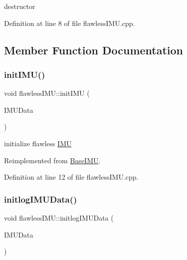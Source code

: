destructor 



Definition at line 8 of file flawless\+I\+M\+U.\+cpp.



\subsection{Member Function Documentation}
\mbox{\label{classflawless_i_m_u_a7dd4d315fa319eef68987b17fb636c43}} 
\subsubsection{\texorpdfstring{init\+I\+M\+U()}{initIMU()}}
{\footnotesize\ttfamily void flawless\+I\+M\+U\+::init\+I\+MU (\begin{DoxyParamCaption}\item[{I\+M\+U\+Struct \&}]{I\+M\+U\+Data }\end{DoxyParamCaption})\hspace{0.3cm}{\ttfamily [virtual]}}



initialize flawless \hyperlink{class_i_m_u}{I\+MU} 



Reimplemented from \hyperlink{class_base_i_m_u_ade02045afd03f290ac1e702db9e1d5a7}{Base\+I\+MU}.



Definition at line 12 of file flawless\+I\+M\+U.\+cpp.

\mbox{\label{classflawless_i_m_u_a4907331c4191fc36fd4f97655bb42c7e}} 
\subsubsection{\texorpdfstring{initlog\+I\+M\+U\+Data()}{initlogIMUData()}}
{\footnotesize\ttfamily void flawless\+I\+M\+U\+::initlog\+I\+M\+U\+Data (\begin{DoxyParamCaption}\item[{I\+M\+U\+Struct \&}]{I\+M\+U\+Data }\end{DoxyParamCaption})}



